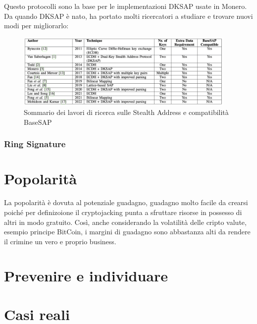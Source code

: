 \documentclass[12pt,a4paper]{article}
\begin{document}
    Questo protocolli sono la base per le implementazioni DKSAP usate in Monero.
    Da quando DKSAP è nato, ha portato molti ricercatori a studiare e trovare
    nuovi modi per migliorarlo:

    \begin{figure}[ht]
        \centering
        \includegraphics[width=0.95\textwidth]{./images/sommario.png}
        \caption{Sommario dei lavori di ricerca sulle Stealth Address e compatibilità BaseSAP}
        \label{fig:summary}
    \end{figure}



\subsubsection{Ring Signature}

\section{Popolarità}
La popolarità è dovuta al potenziale guadagno, guadagno molto facile da crearsi
poiché per definizoione il cryptojacking punta a sfruttare risorse in possesso
di altri in modo gratuito. Così, anche considerando la volatilità delle cripto
valute, esempio principe BitCoin, i margini di guadagno sono abbastanza alti da
rendere il crimine un vero e proprio business. 

\section{Prevenire e individuare}

\section{Casi reali}
\end{document}
